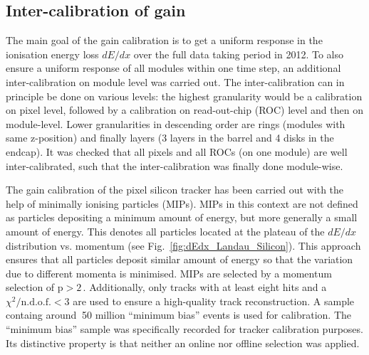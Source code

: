\subsection*{Inter-calibration of gain}
The main goal of the gain calibration is to get a uniform response in the ionisation energy loss $dE/dx$ over the full data taking period in 2012.
To also ensure a uniform response of all modules within one time step, an additional inter-calibration on module level was carried out.
The inter-calibration can in principle be done on various levels: the highest granularity would be a calibration on pixel level, followed by a calibration on read-out-chip (ROC) level and then on module-level.
Lower granularities in descending order are rings (modules with same z-position) and finally layers (3 layers in the barrel and 4 disks in the endcap). 
It was checked that all pixels and all ROCs (on one module) are well inter-calibrated, such that the inter-calibration was finally done module-wise.

The gain calibration of the pixel silicon tracker has been carried out with the help of minimally ionising particles (MIPs).
MIPs in this context are not defined as particles depositing a minimum amount of energy, but more generally a small amount of energy.
This denotes all particles located at the plateau of the $dE/dx$ distribution vs. momentum (see Fig.~\ref{fig:dEdx_Landau_Silicon}).
This approach ensures that all particles deposit similar amount of energy so that the variation due to different momenta is minimised.
MIPs are selected by a momentum selection of $\text{p}>2\,$\gev.
Additionally, only tracks with at least eight hits and a $\chi^2/\text{n.d.o.f.}<3$ are used to ensure a high-quality track reconstruction.
A sample containg around $~$50 million ``minimum bias'' events is used for calibration.
The ``minimum bias'' sample was specifically recorded for tracker calibration purposes.
Its distinctive property is that neither an online nor offline selection was applied.

